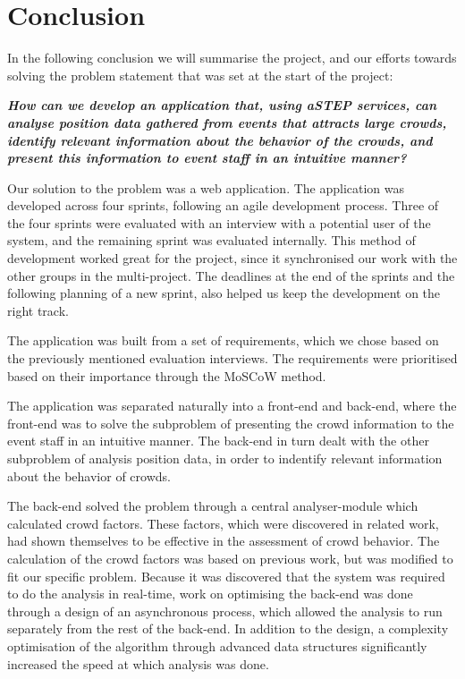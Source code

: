 \chapter{Conclusion}\label{ch:conclusion}


In the following conclusion we will summarise the project, and our efforts towards solving the problem statement that was set at the start of the project:

\vspace{0.5 cm}
\begin{center}
	\textbf{\textit{How can we develop an application that, using aSTEP services, can analyse position data gathered from events that attracts large crowds, identify relevant information about the behavior of the crowds, and present this information to event staff in an intuitive manner?}}
\end{center}

Our solution to the problem was a web application. The application was developed across four sprints, following an agile development process. Three of the four sprints were evaluated with an interview with a potential user of the system, and the remaining sprint was evaluated internally. This method of development worked great for the project, since it synchronised our work with the other groups in the multi-project. The deadlines at the end of the sprints and the following planning of a new sprint, also helped us keep the development on the right track.

The application was built from a set of requirements, which we chose based on the previously mentioned evaluation interviews. The requirements were prioritised based on their importance through the MoSCoW method.

The application was separated naturally into a front-end and back-end, where the front-end was to solve the subproblem of presenting the crowd information to the event staff in an intuitive manner. The back-end in turn dealt with the other subproblem of analysis position data, in order to indentify relevant information about the behavior of crowds.

The back-end solved the problem through a central analyser-module which calculated crowd factors. These factors, which were discovered in related work, had shown themselves to be effective in the assessment of crowd behavior. The calculation of the crowd factors was based on previous work, but was modified to fit our specific problem. Because it was discovered that the system was required to do the analysis in real-time, work on optimising the back-end was done through a design of an asynchronous process, which allowed the analysis to run separately from the rest of the back-end. In addition to the design, a complexity optimisation of the algorithm through advanced data structures significantly increased the speed at which analysis was done.

